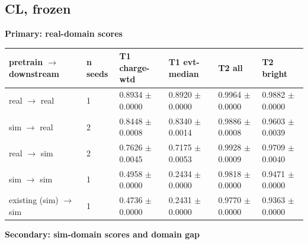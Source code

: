 \documentclass[10pt,a4paper]{article}
\begin{document}
\subsection{CL, frozen}
\textbf{Primary: real-domain scores}

\begin{center}\footnotesize
\setlength{\tabcolsep}{3pt}\renewcommand{\arraystretch}{1.15}
\begin{tabularx}{\linewidth}{LLLLLL}
\toprule
\textbf{pretrain $\rightarrow$ downstream} & \textbf{n seeds} & \textbf{T1 charge-wtd} & \textbf{T1 evt-median} & \textbf{T2 all} & \textbf{T2 bright} \\
\midrule
real $\rightarrow$ real & 1 & 0.8934 $\pm$ 0.0000 & 0.8920 $\pm$ 0.0000 & 0.9964 $\pm$ 0.0000 & 0.9882 $\pm$ 0.0000 \\
sim $\rightarrow$ real & 2 & 0.8448 $\pm$ 0.0008 & 0.8340 $\pm$ 0.0014 & 0.9886 $\pm$ 0.0008 & 0.9603 $\pm$ 0.0039 \\
real $\rightarrow$ sim & 2 & 0.7626 $\pm$ 0.0045 & 0.7175 $\pm$ 0.0053 & 0.9928 $\pm$ 0.0009 & 0.9709 $\pm$ 0.0040 \\
sim $\rightarrow$ sim & 1 & 0.4958 $\pm$ 0.0000 & 0.2434 $\pm$ 0.0000 & 0.9818 $\pm$ 0.0000 & 0.9471 $\pm$ 0.0000 \\
existing (sim) $\rightarrow$ sim & 1 & 0.4736 $\pm$ 0.0000 & 0.2431 $\pm$ 0.0000 & 0.9770 $\pm$ 0.0000 & 0.9363 $\pm$ 0.0000 \\
\bottomrule
\end{tabularx}
\end{center}
\textbf{Secondary: sim-domain scores and domain gap}
\end{document}
